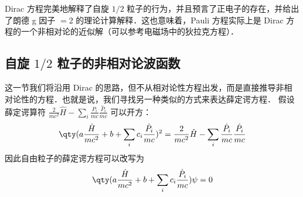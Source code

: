 Dirac 方程完美地解释了自旋 $1/2$ 粒子的行为，并且预言了正电子的存在，并给出了朗德 g 因子 $=2$ 的理论计算解释．这也意味着，Pauli 方程实际上是 Dirac 方程的一个非相对论的近似解（可以参考电磁场中的狄拉克方程）．

\subsection{自旋 $1/2$ 粒子的非相对论波函数}
这一节我们将沿用 Dirac 的思路，但不从相对论性方程出发，而是直接推导非相对论性的方程．也就是说，我们寻找另一种类似的方式来表达薛定谔方程．
假设薛定谔算符 $\frac{2}{mc^2} \hat H-\sum_i\frac{P_i}{mc}\frac{\hat P_i}{mc}$ 可以开方：
\begin{equation}
\qty(a\frac{\hat H}{mc^2}+b+\sum_ic_i \frac{\hat P_i}{mc})^2=\frac{2}{mc^2} \hat H-\sum_i\frac{\hat P_i}{mc}\frac{\hat P_i}{mc}
\end{equation}
因此自由粒子的薛定谔方程可以改写为
\begin{equation}\label{scheq2_eq2}
\qty(a\frac{\hat H}{mc^2}+b+\sum_ic_i \frac{\hat P_i}{mc})\psi=0
\end{equation}

